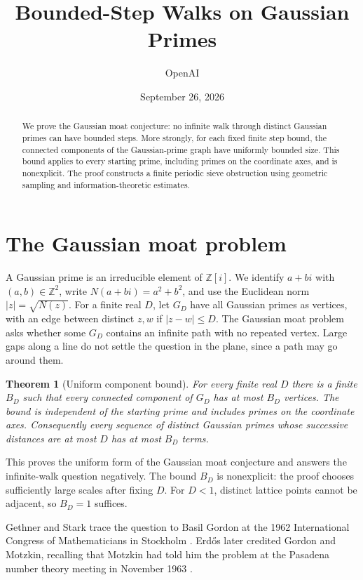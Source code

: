 \documentclass[11pt]{article}
\title{Bounded-Step Walks on Gaussian Primes}
\author{OpenAI}
\date{September 26, 2026}
\newtheorem{theorem}{Theorem}[section]
\theoremstyle{definition}
\theoremstyle{remark}
\newcommand{\Z}{\mathbb Z}
\numberwithin{equation}{section}
\begin{document}
\maketitle
\begin{abstract}
We prove the Gaussian moat conjecture: no infinite walk through distinct
Gaussian primes can have bounded steps. More strongly, for each fixed finite
step bound, the connected components of the Gaussian-prime graph have
uniformly bounded size. This bound applies to every starting prime, including
primes on the coordinate axes, and is nonexplicit. The proof constructs a
finite periodic sieve obstruction using geometric sampling and
information-theoretic estimates.
\end{abstract}

\section{The Gaussian moat problem}\label{sec:introduction}\label{sec:intro}
A Gaussian prime is an irreducible element of $\Z[i]$.
We identify $a+bi$ with $(a,b)\in\Z^2$, write $N(a+bi)=a^2+b^2$,
and use the Euclidean norm $|z|=\sqrt{N(z)}$.
For a finite real $D$, let $G_D$ have all Gaussian primes as vertices,
with an edge between distinct $z,w$ if $|z-w|\le D$.
The Gaussian moat problem asks whether some $G_D$ contains an infinite
path with no repeated vertex. Large gaps along a line do not settle the
question in the plane, since a path may go around them.

\begin{theorem}[Uniform component bound]\label{thm:main}\label{cor:uniform}
For every finite real $D$ there is a finite $B_D$ such that every
connected component of $G_D$ has at most $B_D$ vertices.
The bound is independent of the starting prime and includes primes on
the coordinate axes. Consequently every sequence of distinct Gaussian
primes whose successive distances are at most $D$ has at most $B_D$ terms.
\end{theorem}

This proves the uniform form of the Gaussian moat conjecture and answers
the infinite-walk question negatively. The bound $B_D$ is nonexplicit:
the proof chooses
sufficiently large scales after fixing $D$. For $D<1$, distinct lattice
points cannot be adjacent, so $B_D=1$ suffices.

Gethner and Stark trace the question to Basil Gordon at the 1962
International Congress of Mathematicians in Stockholm
\cite[p.~289]{GethnerStark}. Erd\H{o}s later credited Gordon and Motzkin,
recalling that Motzkin had told him the problem at the Pasadena number
theory meeting in November 1963 \cite[p.~69]{Erdos1977}.
\end{document}
